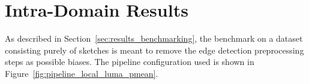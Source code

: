 \section{Intra-Domain Results}\label{sec:intra_results}

As described in Section~\ref{sec:results_benchmarking}, the benchmark on a
dataset consisting purely of sketches is meant to remove the edge detection
preprocessing steps as possible biases. The pipeline configuration used is
shown in Figure~\ref{fig:pipeline_local_luma_pmean}.

\begin{table}[h]
    \centering
    
    \caption[Precisions]{
    }
    \label{tab:results_precision_local_luma_pmean}
\end{table}
